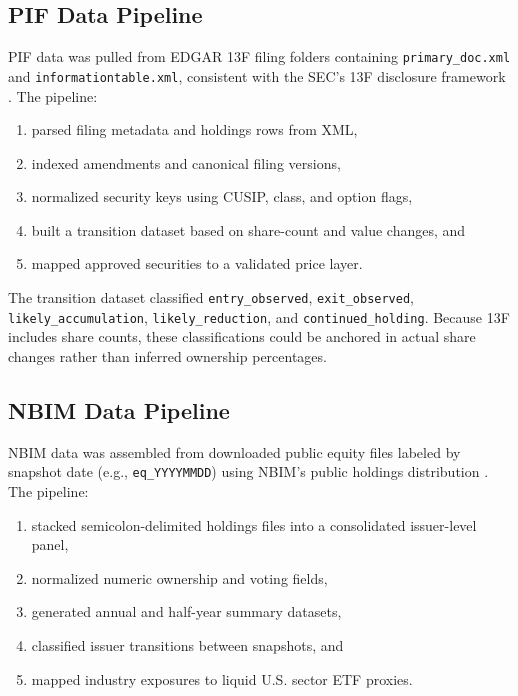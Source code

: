 \documentclass[conference]{IEEEtran}
\begin{document}
\subsection{PIF Data Pipeline}

PIF data was pulled from EDGAR 13F filing folders containing \texttt{primary\_doc.xml} and \texttt{informationtable.xml}, consistent with the SEC's 13F disclosure framework \cite{sec13f}. The pipeline:
\begin{enumerate}[leftmargin=1.4em]
    \item parsed filing metadata and holdings rows from XML,
    \item indexed amendments and canonical filing versions,
    \item normalized security keys using CUSIP, class, and option flags,
    \item built a transition dataset based on share-count and value changes, and
    \item mapped approved securities to a validated price layer.
\end{enumerate}

The transition dataset classified \texttt{entry\_observed}, \texttt{exit\_observed}, \texttt{likely\_accumulation}, \texttt{likely\_reduction}, and \texttt{continued\_holding}. Because 13F includes share counts, these classifications could be anchored in actual share changes rather than inferred ownership percentages.

\subsection{NBIM Data Pipeline}

NBIM data was assembled from downloaded public equity files labeled by snapshot date (e.g., \texttt{eq\_YYYYMMDD}) using NBIM's public holdings distribution \cite{nbim,nbimholdings}. The pipeline:
\begin{enumerate}[leftmargin=1.4em]
    \item stacked semicolon-delimited holdings files into a consolidated issuer-level panel,
    \item normalized numeric ownership and voting fields,
    \item generated annual and half-year summary datasets,
    \item classified issuer transitions between snapshots, and
    \item mapped industry exposures to liquid U.S. sector ETF proxies.
\end{enumerate}
\end{document}
